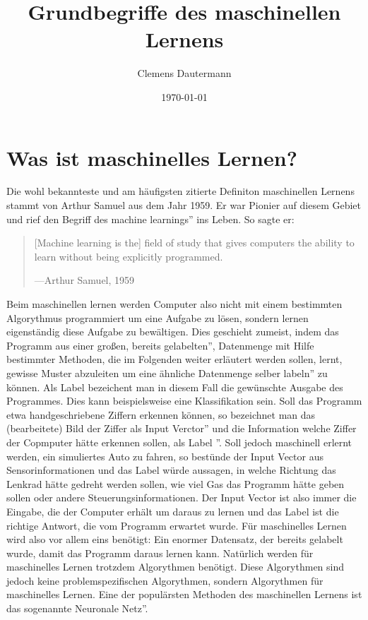 \documentclass{article}
\author{Clemens Dautermann}
\title{Grundbegriffe des maschinellen Lernens}
\date{\today{}}
\begin{document}
\maketitle{}
\newpage
\tableofcontents{}
\newpage

\section{Was ist maschinelles Lernen?}
Die wohl bekannteste und am häufigsten zitierte Definiton maschinellen Lernens stammt von Arthur Samuel aus dem Jahr 1959. Er war Pionier auf diesem Gebiet und rief den Begriff des \glqq machine learnings'' ins Leben. So sagte er:
\begin{quote}
	[Machine learning is the] field of study that gives computers the ability to learn without being explicitly programmed\cite{1}.
	\begin{flushright}
		---Arthur Samuel, 1959
	\end{flushright}
\end{quote}
Beim maschinellen lernen werden Computer also nicht mit einem bestimmten Algorythmus programmiert um eine Aufgabe zu lösen, sondern lernen eigenständig diese Aufgabe zu bewältigen. Dies geschieht zumeist, indem das Programm aus einer großen, bereits \glqq gelabelten'', Datenmenge mit Hilfe bestimmter Methoden, die im Folgenden weiter erläutert werden sollen, lernt, gewisse Muster abzuleiten um eine ähnliche Datenmenge selber \glqq labeln'' zu können. Als Label bezeichent man in diesem Fall die gewünschte Ausgabe des Programmes. Dies kann beispielsweise eine Klassifikation sein. Soll das Programm etwa handgeschriebene Ziffern erkennen können, so bezeichnet man das (bearbeitete) Bild der Ziffer als \glqq Input Verctor'' und die Information welche Ziffer der Copmputer hätte erkennen sollen, als \glqq Label ''. Soll jedoch maschinell erlernt werden, ein simuliertes Auto zu fahren, so bestünde der Input Vector aus Sensorinformationen und das Label würde aussagen, in welche Richtung das Lenkrad hätte gedreht werden sollen, wie viel Gas das Programm hätte geben sollen oder andere Steuerungsinformationen. Der Input Vector ist also immer die Eingabe, die der Computer erhält um daraus zu lernen und das Label ist die richtige Antwort, die vom Programm erwartet wurde. Für maschinelles Lernen wird also vor allem eins benötigt: Ein enormer Datensatz, der bereits gelabelt wurde, damit das Programm daraus lernen kann.\newline
Natürlich werden für maschinelles Lernen trotzdem Algorythmen benötigt. Diese Algorythmen sind jedoch keine problemspezifischen Algorythmen, sondern Algorythmen für maschinelles Lernen. Eine der populärsten Methoden des maschinellen Lernens ist das sogenannte \glqq Neuronale Netz''. 
\end{document}
